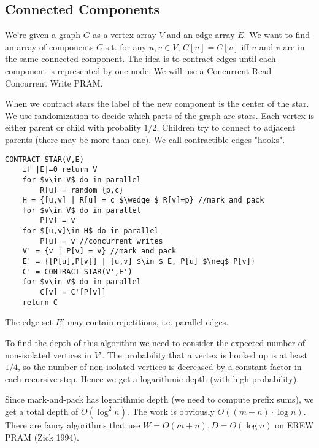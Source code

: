 \subsection{Connected Components}

We're given a graph $G$ as a vertex array $V$ and an edge array $E$. We want to find an array of components $C$ s.t. for any $u,v\in V$, $C[u] = C[v]$ iff $u$ and $v$ are in the same connected component. The idea is to contract edges until each component is represented by one node. We will use a Concurrent Read Concurrent Write PRAM.

When we contract stars the label of the new component is the center of the star. We use randomization to decide which parts of the graph are stars. Each vertex is either parent or child with probality $1/2$. Children try to connect to adjacent parents (there may be more than one). We call contractible edges "hooks".

\begin{lstlisting}
CONTRACT-STAR(V,E)
	if |E|=0 return V
	for $v\in V$ do in parallel
		R[u] = random {p,c}
	H = {[u,v] | R[u] = c $\wedge $ R[v]=p} //mark and pack
	for $v\in V$ do in parallel
		P[v] = v
	for $[u,v]\in H$ do in parallel
		P[u] = v //concurrent writes
	V' = {v | P[v] = v} //mark and pack
	E' = {[P[u],P[v]] | [u,v] $\in $ E, P[u] $\neq$ P[v]}
	C' = CONTRACT-STAR(V',E')
	for $v\in V$ do in parallel
		C[v] = C'[P[v]]
	return C	
\end{lstlisting}

The edge set $E'$ may contain repetitions, i.e. parallel edges.

To find the depth of this algorithm we need to consider the expected number of non-isolated vertices in $V'$. The probability that a vertex is hooked up is at least $1/4$, so the number of non-isolated vertices is decreased by a constant factor in each recursive step. Hence we get a logarithmic depth (with high probability).

Since mark-and-pack has logarithmic depth (we need to compute prefix sums), we get a total depth of $O(\log^2 n)$. The work is obviously $O((m+n)\cdot \log n)$. There are fancy algorithms that use $W=O(m+n), D=O(\log n)$ on EREW PRAM (Zick 1994).